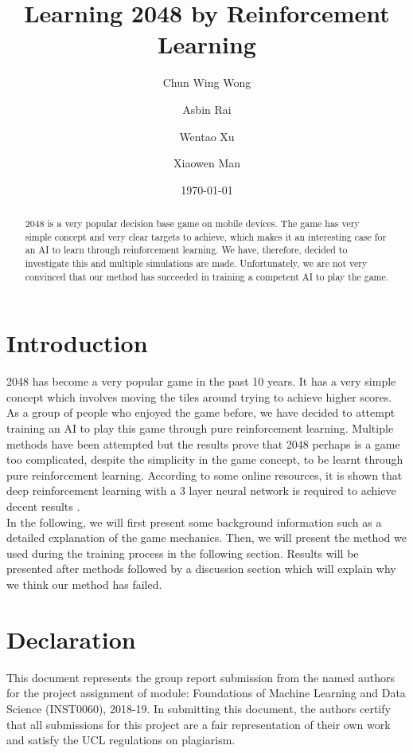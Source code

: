\documentclass[11point]{article}
\begin{document}
\title{Learning 2048 by Reinforcement Learning}
\author[*]{Chun Wing Wong}
\author[**]{Asbin Rai}
\author[**]{Wentao Xu}
\author[**]{Xiaowen Man}
\date{\today}

\maketitle

\begin{abstract}
2048 is a very popular decision base game on mobile devices. The game has very simple concept and very clear targets to achieve, which makes it an interesting case for an AI to learn through reinforcement learning. We have, therefore, decided to investigate this and multiple simulations are made. Unfortunately, we are not very convinced that our method has succeeded in training a competent AI to play the game. 
\end{abstract}

\section{Introduction}
2048 has become a very popular game in the past 10 years. It has a very simple concept which involves moving the tiles around trying to achieve higher scores. As a group of people who enjoyed the game before, we have decided to attempt training an AI to play this game through pure reinforcement learning.  Multiple methods have been attempted but the results prove that 2048 perhaps is a game too complicated, despite the simplicity in the game concept, to be learnt through pure reinforcement learning. According to some online resources, it is shown that deep reinforcement learning with a 3 layer neural network is required to achieve decent results \cite{dedieu2017deep}.
\\

In the following, we will first present some background information such as a detailed explanation of the game mechanics. Then, we will present the method we used during the training process in the following section. Results will be presented after methods followed by a discussion section which will explain why we think our method has failed. 








\section*{Declaration}
This document represents the group report submission from the named authors for the project assignment of module: Foundations of Machine Learning and Data Science (INST0060), 2018-19. In submitting this document, the authors certify that all submissions for this project are a fair representation of their own work and satisfy the UCL regulations on  plagiarism.



\end{document}
